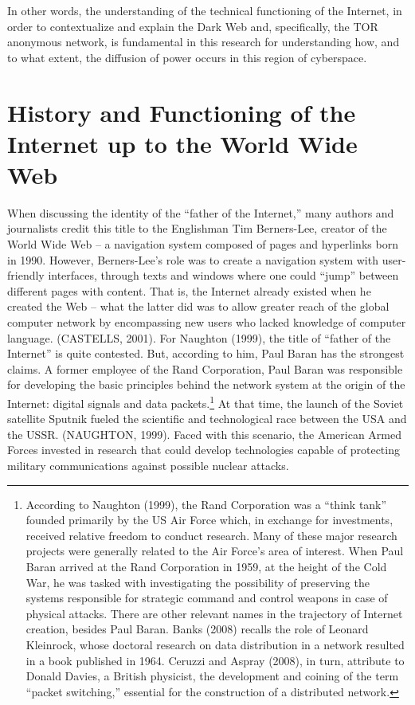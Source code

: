 In other words, the understanding of the technical functioning of the Internet, in order to contextualize and explain the Dark Web and, specifically, the TOR anonymous network, is fundamental in this research for understanding how, and to what extent, the diffusion of power occurs in this region of cyberspace.

\section{History and Functioning of the Internet up to the World Wide Web}

When discussing the identity of the ``father of the Internet,'' many authors and journalists credit this title to the Englishman Tim Berners-Lee, creator of the World Wide Web -- a navigation system composed of pages and hyperlinks born in 1990. However, Berners-Lee's role was to create a navigation system with user-friendly interfaces, through texts and windows where one could ``jump'' between different pages with content. That is, the Internet already existed when he created the Web -- what the latter did was to allow greater reach of the global computer network by encompassing new users who lacked knowledge of computer language. (CASTELLS, 2001). For Naughton (1999), the title of ``father of the Internet'' is quite contested. But, according to him, Paul Baran has the strongest claims. A former employee of the Rand Corporation, Paul Baran was responsible for developing the basic principles behind the network system at the origin of the Internet: digital signals and data packets.\footnote{According to Naughton (1999), the Rand Corporation was a ``think tank'' founded primarily by the US Air Force which, in exchange for investments, received relative freedom to conduct research. Many of these major research projects were generally related to the Air Force's area of interest. When Paul Baran arrived at the Rand Corporation in 1959, at the height of the Cold War, he was tasked with investigating the possibility of preserving the systems responsible for strategic command and control weapons in case of physical attacks. There are other relevant names in the trajectory of Internet creation, besides Paul Baran. Banks (2008) recalls the role of Leonard Kleinrock, whose doctoral research on data distribution in a network resulted in a book published in 1964. Ceruzzi and Aspray (2008), in turn, attribute to Donald Davies, a British physicist, the development and coining of the term ``packet switching,'' essential for the construction of a distributed network.} At that time, the launch of the Soviet satellite Sputnik fueled the scientific and technological race between the USA and the USSR. (NAUGHTON, 1999). Faced with this scenario, the American Armed Forces invested in research that could develop technologies capable of protecting military communications against possible nuclear attacks.

